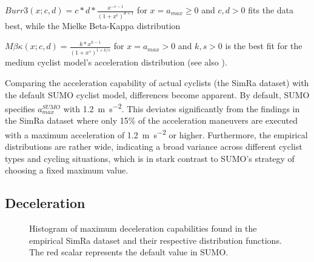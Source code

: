 $Burr3(x; c,d) = c*d*\frac{x^{-c-1}}{(1+x^c)^{d+1}}$ for $x = a_{max} \geq 0$ and $c,d > 0$ fits the data best, while the Mielke Beta-Kappa distribution~\cite{mielke1973distribution}

$M\beta\kappa(x; c,d) = \frac{k*x^{k-1}}{(1+x^s)^{1+k/s}}$ for $x = a_{max} > 0$ and $k,s > 0$ is the best fit for the medium cyclist model's acceleration distribution (see also ).

Comparing the acceleration capability of actual cyclists (the SimRa dataset) with the default SUMO cyclist model, differences become apparent.
By default, SUMO specifies $a_{max}^{SUMO}$ with \SI{1.2}{\metre\per\square\second}.
This deviates significantly from the findings in the SimRa dataset where only \num{15}\% of the acceleration maneuvers are executed with a maximum acceleration of \SI{1.2}{\metre\per\square\second} or higher.
Furthermore, the empirical distributions are rather wide, indicating a broad variance across different cyclist types and cycling situations, which is in stark contrast to SUMO's strategy of choosing a fixed maximum value.

\subsection{Deceleration}
\label{subsec:deceleration_preprocessing}

\begin{figure}
    \centering
    \hfill
    \caption{%
        Histogram of maximum deceleration capabilities found in the empirical SimRa dataset and their respective distribution functions.
        The red scalar represents the default value in SUMO.
    }%
    \label{fig:analysis_max_deceleration_dist_fit}
\end{figure}

